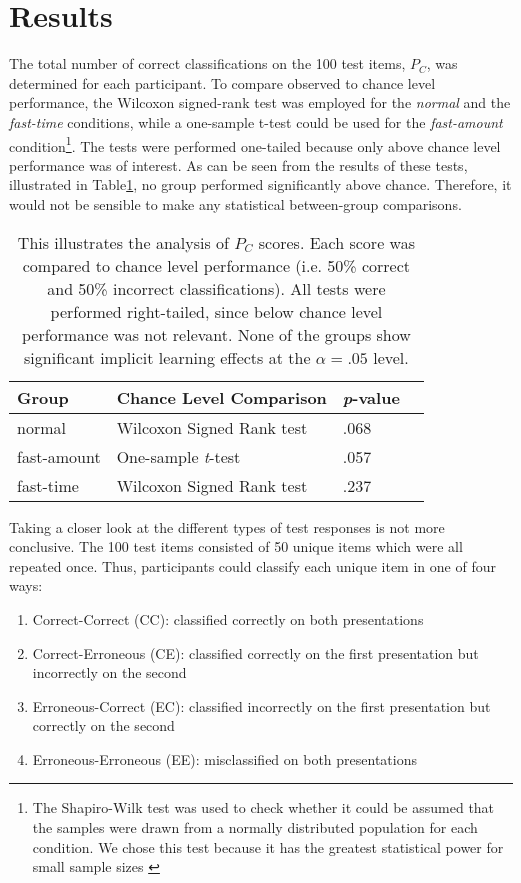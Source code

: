 \section{Results}
The total number of correct classifications on the 100 test items, $P_{C}$, was determined for each participant. To compare observed to chance level performance, the Wilcoxon signed-rank test was employed for the \textit{normal} and the \textit{fast-time} conditions, while a one-sample t-test could be used for the \textit{fast-amount} condition\footnote{The Shapiro-Wilk test was used to check whether it could be assumed that the samples were drawn from a normally distributed population for each condition. We chose this test because it has the greatest statistical power for small sample sizes \citep{yazici2007comparison}}. The tests were performed one-tailed because only above chance level performance was of interest. As can be seen from the results of these tests, illustrated in Table\ref{table1}, no group performed significantly above chance. Therefore, it would not be sensible to make any statistical between-group comparisons. \\
\begin{table}[h]
\centering
\begin{tabular}{l l l l }
\toprule
\textbf{Group} & \textbf{Chance Level Comparison} & \textbf{\textit{p}-value} \\
\midrule
  normal      & Wilcoxon Signed Rank test        & .068 \\
  fast-amount & One-sample \textit{t}-test       & .057 \\
  fast-time   & Wilcoxon Signed Rank test        & .237 \\      
\bottomrule
\end{tabular}
\caption{This illustrates the analysis of $P_C$ scores. Each score was compared to chance level performance (i.e. 50\% correct and 50\% incorrect classifications). All tests were performed right-tailed, since below chance level performance was not relevant. None of the groups show significant implicit learning effects at the $\alpha=.05$ level.}
\label{table1}
\end{table}
Taking a closer look at the different types of test responses is not more conclusive. The 100 test items consisted of 50 unique items which were all repeated once. Thus, participants could classify each unique item in one of four ways:
\begin{enumerate}
\item Correct-Correct (CC): classified correctly on both presentations
\item Correct-Erroneous (CE): classified correctly on the first presentation but incorrectly on the second
\item Erroneous-Correct (EC): classified incorrectly on the first presentation but correctly on the second
\item Erroneous-Erroneous (EE): misclassified on both presentations
\end{enumerate}
